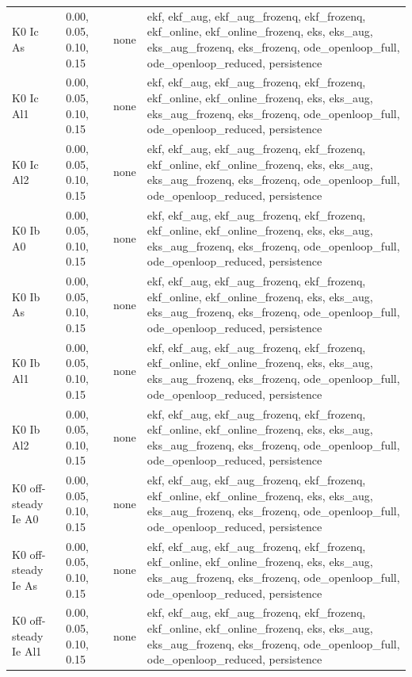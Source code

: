 \begin{table}[t]
\begin{tabular}{llll}
K0 Ic As & 0.00, 0.05, 0.10, 0.15 & none & ekf, ekf\_aug, ekf\_aug\_frozenq, ekf\_frozenq, ekf\_online, ekf\_online\_frozenq, eks, eks\_aug, eks\_aug\_frozenq, eks\_frozenq, ode\_openloop\_full, ode\_openloop\_reduced, persistence \\
K0 Ic Al1 & 0.00, 0.05, 0.10, 0.15 & none & ekf, ekf\_aug, ekf\_aug\_frozenq, ekf\_frozenq, ekf\_online, ekf\_online\_frozenq, eks, eks\_aug, eks\_aug\_frozenq, eks\_frozenq, ode\_openloop\_full, ode\_openloop\_reduced, persistence \\
K0 Ic Al2 & 0.00, 0.05, 0.10, 0.15 & none & ekf, ekf\_aug, ekf\_aug\_frozenq, ekf\_frozenq, ekf\_online, ekf\_online\_frozenq, eks, eks\_aug, eks\_aug\_frozenq, eks\_frozenq, ode\_openloop\_full, ode\_openloop\_reduced, persistence \\
K0 Ib A0 & 0.00, 0.05, 0.10, 0.15 & none & ekf, ekf\_aug, ekf\_aug\_frozenq, ekf\_frozenq, ekf\_online, ekf\_online\_frozenq, eks, eks\_aug, eks\_aug\_frozenq, eks\_frozenq, ode\_openloop\_full, ode\_openloop\_reduced, persistence \\
K0 Ib As & 0.00, 0.05, 0.10, 0.15 & none & ekf, ekf\_aug, ekf\_aug\_frozenq, ekf\_frozenq, ekf\_online, ekf\_online\_frozenq, eks, eks\_aug, eks\_aug\_frozenq, eks\_frozenq, ode\_openloop\_full, ode\_openloop\_reduced, persistence \\
K0 Ib Al1 & 0.00, 0.05, 0.10, 0.15 & none & ekf, ekf\_aug, ekf\_aug\_frozenq, ekf\_frozenq, ekf\_online, ekf\_online\_frozenq, eks, eks\_aug, eks\_aug\_frozenq, eks\_frozenq, ode\_openloop\_full, ode\_openloop\_reduced, persistence \\
K0 Ib Al2 & 0.00, 0.05, 0.10, 0.15 & none & ekf, ekf\_aug, ekf\_aug\_frozenq, ekf\_frozenq, ekf\_online, ekf\_online\_frozenq, eks, eks\_aug, eks\_aug\_frozenq, eks\_frozenq, ode\_openloop\_full, ode\_openloop\_reduced, persistence \\
K0 off-steady Ie A0 & 0.00, 0.05, 0.10, 0.15 & none & ekf, ekf\_aug, ekf\_aug\_frozenq, ekf\_frozenq, ekf\_online, ekf\_online\_frozenq, eks, eks\_aug, eks\_aug\_frozenq, eks\_frozenq, ode\_openloop\_full, ode\_openloop\_reduced, persistence \\
K0 off-steady Ie As & 0.00, 0.05, 0.10, 0.15 & none & ekf, ekf\_aug, ekf\_aug\_frozenq, ekf\_frozenq, ekf\_online, ekf\_online\_frozenq, eks, eks\_aug, eks\_aug\_frozenq, eks\_frozenq, ode\_openloop\_full, ode\_openloop\_reduced, persistence \\
K0 off-steady Ie Al1 & 0.00, 0.05, 0.10, 0.15 & none & ekf, ekf\_aug, ekf\_aug\_frozenq, ekf\_frozenq, ekf\_online, ekf\_online\_frozenq, eks, eks\_aug, eks\_aug\_frozenq, eks\_frozenq, ode\_openloop\_full, ode\_openloop\_reduced, persistence \\

\end{tabular}
\end{table}
